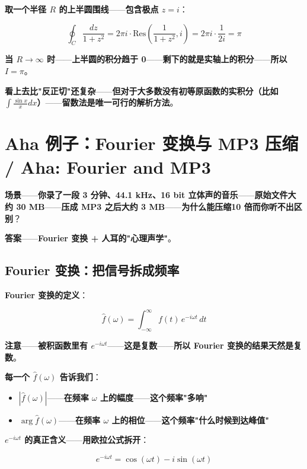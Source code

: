 \textbf{取一个半径 $R$ 的上半圆围线}——\textbf{包含极点 $z = i$}：

\[
\oint_C \frac{dz}{1+z^2} = 2\pi i \cdot \text{Res}\left(\frac{1}{1+z^2}, i\right) = 2\pi i \cdot \frac{1}{2i} = \pi
\]

\textbf{当 $R \to \infty$ 时}——\textbf{上半圆的积分趋于 0}——\textbf{剩下的就是实轴上的积分}——\textbf{所以 $I = \pi$}。

\textbf{看上去比"反正切"还复杂}——\textbf{但对于\textbf{大多数没有初等原函数的实积分}（比如 $\int \frac{\sin x}{x} dx$）}——\textbf{留数法是\textbf{唯一可行的解析方法}}。

\section{Aha 例子：Fourier 变换与 MP3 压缩 / Aha: Fourier and MP3}

\textbf{场景}——\textbf{你录了一段 \textbf{3 分钟、44.1 kHz、16 bit 立体声}的音乐}——\textbf{原始文件大约 \textbf{30 MB}}——\textbf{压成 MP3 之后大约 \textbf{3 MB}}——\textbf{为什么能压缩\textbf{10 倍}而你听不出区别}？

\textbf{答案}——\textbf{Fourier 变换 + 人耳的"心理声学"}。

\subsection{Fourier 变换：把信号拆成频率}

\textbf{Fourier 变换的定义}：

\[
\hat{f}(\omega) = \int_{-\infty}^{\infty} f(t)\, e^{-i\omega t}\, dt
\]

\textbf{注意}——\textbf{被积函数里有 $e^{-i\omega t}$}——\textbf{这是\textbf{复数}}——\textbf{所以 Fourier 变换的结果\textbf{天然是复数}}。

\textbf{每一个 $\hat{f}(\omega)$ 告诉我们}：

\begin{itemize}
\item \textbf{$|\hat{f}(\omega)|$}——\textbf{在频率 $\omega$ 上的\textbf{幅度}}——\textbf{这个频率"多响"}
\item \textbf{$\arg \hat{f}(\omega)$}——\textbf{在频率 $\omega$ 上的\textbf{相位}}——\textbf{这个频率"什么时候到达峰值"}
\end{itemize}

\textbf{$e^{-i\omega t}$ 的真正含义}——\textbf{用欧拉公式拆开}：

\[
e^{-i\omega t} = \cos(\omega t) - i\sin(\omega t)
\]

